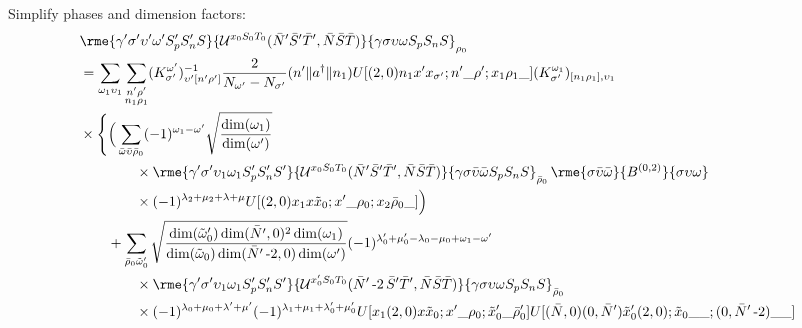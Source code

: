 \documentclass[%
  aps,%
  prc,%
  showpacs,%
  superscriptaddress,%
  onecolumn,%
  notitlepage,%
  11pt,%
  floatfix,%
  amsmath,%
  amssymb,%
]{revtex4-2}
\newcommand{\negative}{\,\text{-}}
\begin{document}
Simplify phases and dimension factors:
\begin{align*}
  &
  \rme{\gamma'\sigma'\upsilon'\omega'S_p'S_n'S}{\mathcal{U}^{x_0 S_0 T_0}(\bar{N}'\bar{S}'\bar{T}',\bar{N}\bar{S}\bar{T})}{\gamma\sigma\upsilon\omega S_p S_n S}_{\rho_0}\\
  &=\sum_{\omega_1\upsilon_1} \sum_{\substack{n'\rho'\\n_1\rho_1}}(K_{\sigma'}^{\omega'})_{\upsilon'[n'\rho']}^{-1}\frac{2}{N_{\omega'} - N_{\sigma'}}(n'\Vert{}a^\dagger\Vert{}n_1) U[(2,0)n_1 x' x_{\sigma'};n'\_\rho';x_1\rho_1\_](K_{\sigma'}^{\omega_1})_{[n_1\rho_1],\upsilon_1}\\
  &\times\Bigg\{\Big(\sum_{\bar{\omega}\bar{\upsilon}\bar{\rho}_0}
      (-1)^{\omega_1-\omega'}
      \sqrt{\frac{\dim(\omega_1)}{\dim(\omega')}}
      \\
      & \qquad \qquad \times
      \rme{\gamma'\sigma'\upsilon_1\omega_1 S_p' S_n' S'}{\mathcal{U}^{x_0S_0T_0}(\bar{N}'\bar{S}'\bar{T}',\bar{N}\bar{S}\bar{T})}{\gamma \sigma \bar{\upsilon}\bar{\omega} S_p S_n S}_{\bar{\rho}_0} \, \rme{\sigma \bar{\upsilon}\bar{\omega}}{B^{(0,2)}}{\sigma \upsilon \omega}\\
  &\qquad\qquad\times
      (-1)^{\lambda_2+\mu_2+\lambda+\mu} U[(2,0) x_1 x \tilde{x}_0; x' \_ \rho_0; x_2\bar{\rho}_0\_]
    \Big)\\
  &\qquad+\sum_{\bar{\rho}_0\tilde{\omega}_0'}
  \sqrt{\frac{\dim(\tilde{\omega}_0')\dim(\bar{N}',0)^2\dim(\omega_1)}{\dim(\tilde{\omega}_0)\dim(\bar{N}'\negative2,0)\dim(\omega')}}
  (-1)^{\lambda_0'+\mu_0'-\lambda_0-\mu_0+\omega_1-\omega'}
  \\
  & \qquad \qquad \times
  \rme{\gamma'\sigma'\upsilon_1\omega_1 S_p' S_n' S'}{\mathcal{U}^{x_0'S_0T_0}(\bar{N}'\negative2\,\bar{S}'\bar{T}',\bar{N}\bar{S}\bar{T})}{\gamma \sigma \upsilon \omega S_p S_n S}_{\bar{\rho}_0}\\
  &\qquad\qquad\times
      (-1)^{\lambda_0+\mu_0+\lambda'+\mu'}(-1)^{\lambda_1+\mu_1+\lambda_0'+\mu_0'} U[x_1 (2,0) x \tilde{x}_0; x'\_\rho_0;\tilde{x}_0'\_\bar{\rho}_0']
      U[(\bar{N},0) (0,\bar{N}') \tilde{x}_0' (2,0);\tilde{x}_0\_\_;(0,\bar{N}'\negative2)\_\_]\\

\end{align*}
\end{document}
